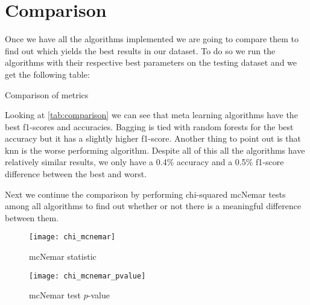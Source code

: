 
\section{Comparison}%
\label{sec:comparison}


Once we have all the algorithms implemented we are going to compare them to find out which yields the best results in our dataset. To do so we run the algorithms with their respective best parameters on the testing dataset and we get the following table:

\begin{table}[H]
\centering
\caption{Comparison of metrics}%
\label{tab:comparison}

\end{table}

Looking at \cref{tab:comparison} we can see that meta learning algorithms have the best f1-scores and accuracies. Bagging is tied with random forests for the best accuracy but it has a slightly higher f1-score. Another thing to point out is that knn is the worse performing algorithm. Despite all of this all the algorithms have relatively similar results, we only have a 0.4\% accuracy and a 0.5\% f1-score difference between the best and worst. 

Next we continue the comparison by performing chi-squared mcNemar tests among all algorithms to find out whether or not there is a meaningful difference between them.

\begin{figure}[H]
\centering
\texttt{[image: chi\_mcnemar]}
\caption{mcNemar statistic}
\end{figure}

\begin{figure}[H]
\centering
\texttt{[image: chi\_mcnemar\_pvalue]}
\caption{mcNemar test $p$-value}
\end{figure}

